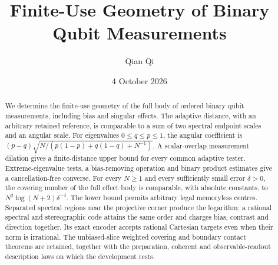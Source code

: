 \documentclass[11pt]{amsart}
\title[Finite-use measurement geometry]{Finite-Use Geometry of Binary Qubit Measurements}
\author{Qian Qi}
\date{4 October 2026}
\numberwithin{equation}{section}
\theoremstyle{definition}\newtheorem{definition}[theorem]{Definition}
\theoremstyle{remark}\newtheorem{remark}[theorem]{Remark}
\begin{document}
\raggedbottom
\begin{abstract}
We determine the finite-use geometry of the full body of ordered binary
qubit measurements, including bias and singular effects. The adaptive
distance, with an arbitrary retained reference, is comparable to a sum
of two spectral endpoint scales and an angular scale. For eigenvalues
$0\le q\le p\le1$, the angular coefficient is
$(p-q)\sqrt{N/(p(1-p)+q(1-q)+N^{-1})}$. A scalar-overlap measurement
dilation gives a finite-distance upper bound for every common adaptive
tester. Extreme-eigenvalue tests, a bias-removing operation and binary
product estimates give a cancellation-free converse.
For every $N\ge1$ and every sufficiently small error $\delta>0$, the
covering number of the full effect body is comparable, with absolute
constants, to $N^2\log(N+2)\delta^{-4}$. The lower bound permits arbitrary
legal memoryless centres. Separated spectral regions near the projective
corner produce the logarithm; a rational spectral and stereographic code
attains the same order and charges bias, contrast and direction together.
Its exact encoder accepts rational Cartesian targets even when their
norm is irrational. The unbiased-slice weighted covering and boundary
contact theorems are retained, together with the preparation, coherent
and observable-readout description laws on which the development rests.
\end{abstract}
\maketitle



















\end{document}
